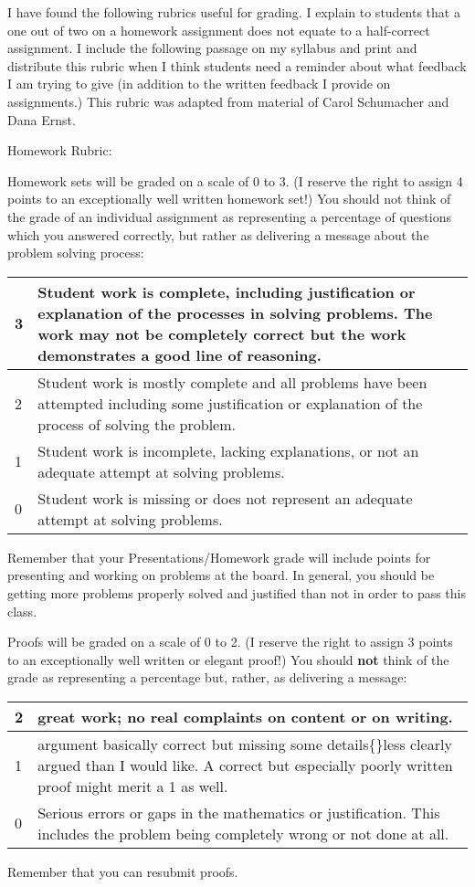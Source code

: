 \begin{annotation}
I have found the following rubrics useful for grading.  I explain to students that a one out of two on a homework assignment does not equate to a half-correct assignment. I include the following passage on my syllabus and print and distribute this rubric when I think students need a reminder about what feedback I am trying to give (in addition to the written feedback I provide on assignments.) This rubric was adapted from material of Carol Schumacher and Dana Ernst.

Homework Rubric:

Homework sets will be graded on a scale of 0 to 3. (I reserve the right to assign 4 points to an exceptionally well written homework set!) You should not think of the grade of an individual assignment as representing a percentage of questions which you answered correctly, but rather as delivering a message about the problem solving process:
\newline
\begin{tabular}{|l|p{11cm}|}
\hline
3 & Student work is complete, including justification or explanation of the processes in solving problems. The work may not be completely correct but the work demonstrates a good line of reasoning. \\
\hline
2 & Student work is mostly complete and all problems have been attempted including some justification or explanation of the process of solving the problem.\\
\hline
1 & Student work is incomplete, lacking explanations, or not an adequate attempt at solving problems. \\
\hline
0 & Student work is missing or does not represent an adequate attempt at solving problems. \\
\hline
\end{tabular}

Remember that your Presentations/Homework grade will include points for presenting and working on problems at the board. In general, you should be getting more problems properly solved and justified than not in order to pass this class.

Proofs will be graded on a scale of 0 to 2. (I reserve the right to assign 3 points to an exceptionally well written or elegant proof!) You should \textbf{not} think of the grade as representing a percentage but, rather, as delivering a message:
\newline
\begin{tabular}{|l|p{11cm}|}
\hline
2 & great work; no real complaints on content or on writing.\\
\hline
1 & argument basically correct but missing some details\{\}less clearly argued than I would like. A correct but especially poorly written proof might merit a 1 as well.\\
\hline
0 & Serious errors or gaps in the mathematics or justification. This includes the problem being completely wrong or not done at all.\\
\hline
\end{tabular}

Remember that you can resubmit proofs.

\end{annotation}

